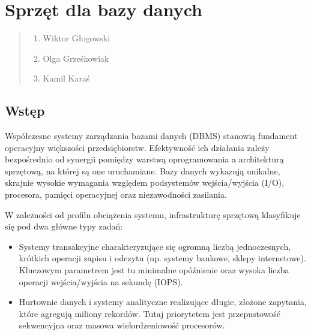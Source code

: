 \documentclass[a4paper,11pt,english,openany,oneside]{sphinxmanual}
\begin{document}
\section{Sprzęt dla bazy danych}
\label{\detokenize{rozdzial_2/rozdzial_21/index:sprzet-dla-bazy-danych}}\label{\detokenize{rozdzial_2/rozdzial_21/index::doc}}\begin{quote}\begin{description}
\begin{enumerate}
%
\item {} 
\sphinxAtStartPar
Wiktor Głogowski

\item {} 
\sphinxAtStartPar
Olga Grześkowiak

\item {} 
\sphinxAtStartPar
Kamil Karaś

\end{enumerate}

\end{description}\end{quote}


\subsection{Wstęp}
\label{\detokenize{rozdzial_2/rozdzial_21/index:wstep}}
\sphinxAtStartPar
Współczesne systemy zarządzania bazami danych (DBMS) stanowią fundament operacyjny większości przedsiębiorstw. Efektywność ich działania zależy bezpośrednio od synergii pomiędzy warstwą oprogramowania a architekturą sprzętową, na której są one uruchamiane. Bazy danych wykazują unikalne, skrajnie wysokie wymagania względem podsystemów wejścia/wyjścia (I/O), procesora, pamięci operacyjnej oraz niezawodności zasilania.

\sphinxAtStartPar
W zależności od profilu obciążenia systemu, infrastrukturę sprzętową klasyfikuje się pod dwa główne typy zadań:
\begin{itemize}
\item {} 
\sphinxAtStartPar
{} Systemy transakcyjne charakteryzujące się ogromną liczbą jednoczesnych, krótkich operacji zapisu i odczytu (np. systemy bankowe, sklepy internetowe). Kluczowym parametrem jest tu minimalne opóźnienie oraz wysoka liczba operacji wejścia/wyjścia na sekundę (IOPS).

\item {} 
\sphinxAtStartPar
{} Hurtownie danych i systemy analityczne realizujące długie, złożone zapytania, które agregują miliony rekordów. Tutaj priorytetem jest przepustowość sekwencyjna oraz masowa wielordzeniowość procesorów.

\end{itemize}
\end{document}

